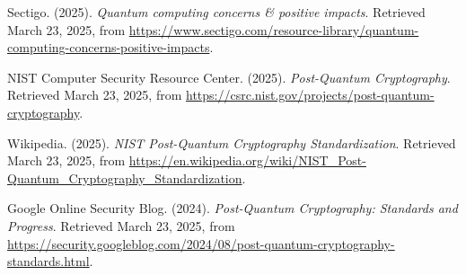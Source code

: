\documentclass[12pt,a4paper]{report}
\begin{document}
\begin{thebibliography}{50}
    Sectigo. (2025).
    \textit{Quantum computing concerns \& positive impacts}.
    Retrieved March 23, 2025, from \url{https://www.sectigo.com/resource-library/quantum-computing-concerns-positive-impacts}.
    
    NIST Computer Security Resource Center. (2025).
    \textit{Post-Quantum Cryptography}.
    Retrieved March 23, 2025, from \url{https://csrc.nist.gov/projects/post-quantum-cryptography}.
    
    Wikipedia. (2025).
    \textit{NIST Post-Quantum Cryptography Standardization}.
    Retrieved March 23, 2025, from \url{https://en.wikipedia.org/wiki/NIST_Post-Quantum_Cryptography_Standardization}.
    
    Google Online Security Blog. (2024).
    \textit{Post-Quantum Cryptography: Standards and Progress}.
    Retrieved March 23, 2025, from \url{https://security.googleblog.com/2024/08/post-quantum-cryptography-standards.html}.
\end{thebibliography}
\end{document}
